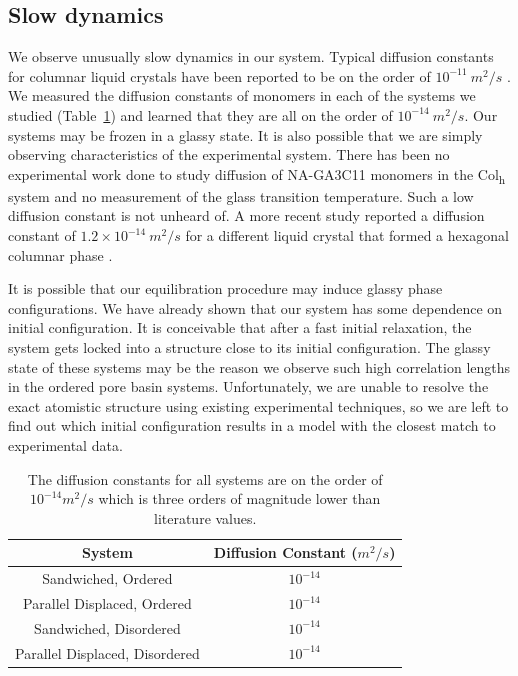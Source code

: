 \documentclass[journal=jpcbfk,manusciprt=article]{achemso}
\begin{document}
  \subsection{Slow dynamics}
  We observe unusually slow dynamics in our system. Typical diffusion constants
  for columnar liquid crystals have been reported to be on the order of
  $10^{-11}~ m^2/s$ \cite{dong_translational_1984}. We measured the diffusion
  constants of monomers in each of the systems we studied (Table~\ref{table:msd})
  and learned that they are all on the order of $10^{-14}~m^2/s$. Our systems may
  be frozen in a glassy state. It is also possible that we are simply observing
  characteristics of the experimental system. There has been no experimental work
  done to study diffusion of NA-GA3C11 monomers in the Col\textsubscript{h}
  system and no measurement of the glass transition temperature. Such a low
  diffusion constant is not unheard of. A more recent study reported a diffusion
  constant of $1.2\times10^{-14}~m^2/s$ for a different liquid crystal that
  formed a hexagonal columnar phase \cite{dvinskikh_molecular_2002}. 

  It is possible that our equilibration procedure may induce glassy phase
  configurations. We have already shown that our system has some dependence on
  initial configuration. It is conceivable that after a fast initial relaxation,
  the system gets locked into a structure close to its initial configuration.
  The glassy state of these systems may be the reason we observe such high
  correlation lengths in the ordered pore basin systems.  Unfortunately, we are
  unable to resolve the exact atomistic structure using existing experimental
  techniques, so we are left to find out which initial configuration results in a
  model with the closest match to experimental data.
  \begin{table}[h]
  \centering
  \begin{tabular}{cc}
  \toprule
  System & Diffusion Constant ($m^2/s$) \\ 
  \midrule
  Sandwiched, Ordered & $10^{-14}$ \\
  Parallel Displaced, Ordered & $10^{-14}$ \\
  Sandwiched, Disordered & $10^{-14}$ \\
  Parallel Displaced, Disordered & $10^{-14}$ \\
  \bottomrule
  \end{tabular}
  \caption{The diffusion constants for all systems are on the order of $10^{-14} m^2/s$ 
  which is three orders of magnitude lower than literature values.}~\label{table:msd}
  \end{table}
\end{document}
